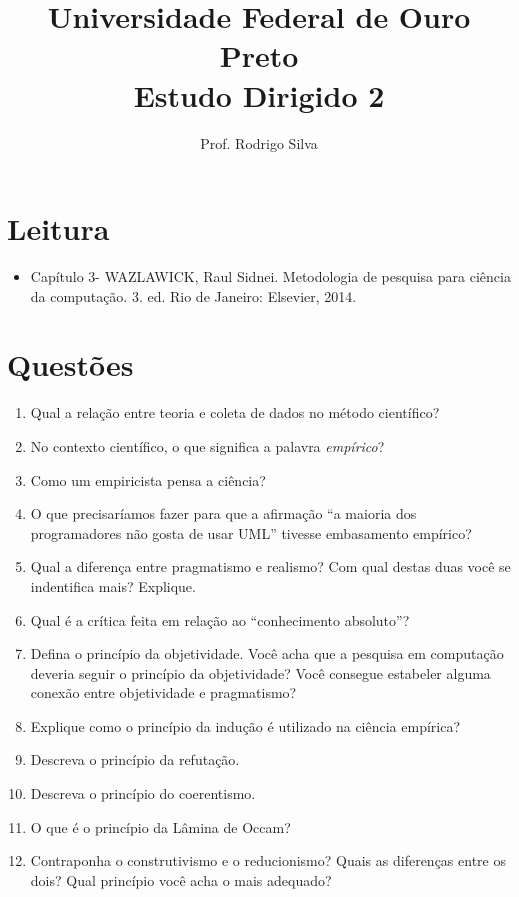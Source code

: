\documentclass{article}
\title{\vspace{-2 cm}Universidade Federal de Ouro Preto \\  Estudo Dirigido 2}
\author{Prof. Rodrigo Silva}
\date{}
\begin{document}
\maketitle

\section{Leitura}

\begin{itemize}
    \item Capítulo 3- WAZLAWICK, Raul Sidnei. Metodologia de pesquisa para ciência da computação. 3. ed. Rio de Janeiro: Elsevier, 2014.
\end{itemize}

\section{Questões}

\begin{enumerate}
\item Qual a relação entre teoria e coleta de dados no método científico?
\item No contexto científico, o que significa a palavra \textit{empírico}?
\item Como um empiricista pensa a ciência? 
\item O que precisaríamos fazer para que a afirmação ``a maioria dos programadores não gosta de usar UML'' tivesse embasamento empírico?
\item Qual a diferença entre pragmatismo e realismo? Com qual destas duas você se indentifica mais? Explique.
\item Qual é a crítica feita em relação ao ``conhecimento absoluto''?
\item Defina o princípio da objetividade. Você acha que a pesquisa em computação deveria seguir o princípio da objetividade? Você consegue estabeler alguma conexão entre objetividade e pragmatismo?
\item Explique como o princípio da indução é utilizado na ciência empírica?
\item Descreva o princípio da refutação.
\item Descreva o princípio do coerentismo.
\item O que é o princípio da Lâmina de Occam?
\item Contraponha o construtivismo e o reducionismo? Quais as diferenças entre os dois? Qual princípio você acha o mais adequado?
\end{enumerate}


%
%
\end{document}
